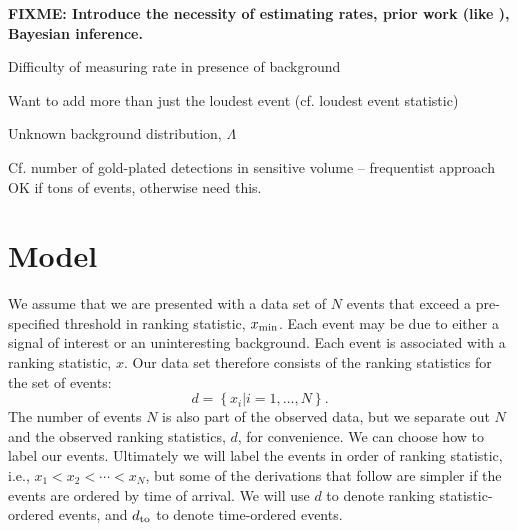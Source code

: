 \documentclass[aps,prd]{revtex4-1}
\newcommand{\fixme}[1]{\textbf{FIXME: #1}}
\newcommand{\mathset}[1]{\left\{ #1 \right\}}
\begin{document}
\fixme{Introduce the necessity of estimating rates, prior work (like
  \cite{Biswas2009}), Bayesian inference.}
  
Difficulty of measuring rate in presence of background

Want to add more than just the loudest event (cf. loudest event
statistic)

Unknown background distribution, $\Lambda$

Cf. number of gold-plated detections in sensitive volume --
frequentist approach OK if tons of events, otherwise need this.


\section{Model}

We assume that we are presented with a data set of $N$ events that exceed a pre-specified threshold in ranking statistic, $x_{\rm min}$.  Each
event may be due to either a signal of interest or an uninteresting
background.  Each event is associated with a ranking statistic, $x$.
Our data set therefore consists of the ranking statistics for the set
of events:
\begin{equation}
  d = \mathset{ x_i | i = 1, \ldots, N } .
\end{equation}
The number of events $N$ is also part of the observed data, but we separate out $N$ and the observed ranking statistics, $d$, for convenience. We can choose how to label our events. Ultimately we will label the events in order of ranking statistic, i.e., $x_1 < x_2 < \cdots < x_N$, but some of the derivations that follow are simpler if the events are ordered by time of arrival. We will use $d$ to denote ranking statistic-ordered events, and $d_{\rm to}$ to denote time-ordered events.
\end{document}
